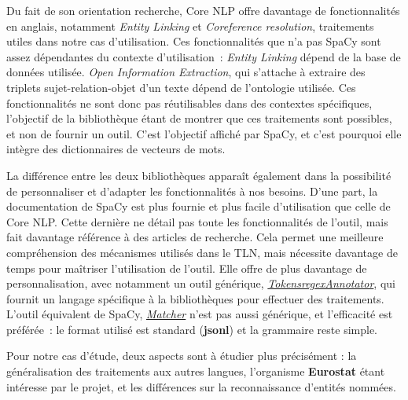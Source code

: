Du fait de son orientation recherche, Core NLP offre davantage de fonctionnalités en anglais, notamment \textit{Entity Linking} et \textit{Coreference resolution}, traitements utiles dans notre cas d'utilisation. Ces fonctionnalités que n'a pas SpaCy sont assez dépendantes du contexte d'utilisation~: \textit{Entity Linking} dépend de la base de données utilisée. \textit{Open Information Extraction}, qui s'attache à extraire des triplets sujet-relation-objet d'un texte dépend de l'ontologie utilisée. Ces fonctionnalités ne sont donc pas réutilisables dans des contextes spécifiques, l'objectif de la bibliothèque étant de montrer que ces traitements sont possibles, et non de fournir un outil. C'est l'objectif affiché par SpaCy, et c'est pourquoi elle intègre des dictionnaires de vecteurs de mots.
\newline

La différence entre les deux bibliothèques apparaît également dans la possibilité de personnaliser et d'adapter les fonctionnalités à nos besoins. D'une part, la documentation de SpaCy est plus fournie et plus facile d'utilisation que celle de Core NLP. Cette dernière ne détail pas toute les fonctionnalités de l'outil, mais fait davantage référence à des articles de recherche. Cela permet une meilleure compréhension des mécanismes utilisés dans le TLN, mais nécessite davantage de temps pour maîtriser l'utilisation de l'outil. Elle offre de plus davantage de personnalisation, avec notamment un outil générique, \href{https://stanfordnlp.github.io/CoreNLP/tokensregex.html}{\textit{TokensregexAnnotator}}, qui fournit un langage spécifique à la bibliothèques pour effectuer des traitements. L'outil équivalent de SpaCy, \href{https://spacy.io/usage/rule-based-matching}{\textit{Matcher}} n'est pas aussi générique, et l'efficacité est préférée~: le format utilisé est standard (\textbf{jsonl}) et la grammaire reste simple.
\newline

Pour notre cas d'étude, deux aspects sont à étudier plus précisément : la généralisation des traitements aux autres langues, l'organisme \textbf{Eurostat} étant intéresse par le projet, et les différences sur la reconnaissance d'entités nommées.
\label{section 3.1.2}

